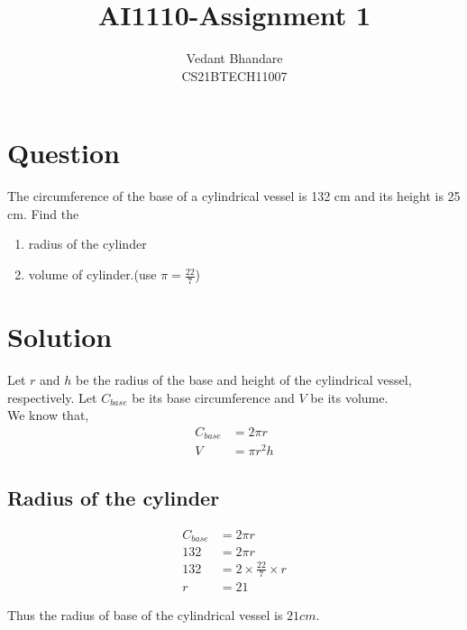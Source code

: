 \documentclass[journal,12pt,twocolumn]{IEEEtran}
\begin{document}
\raggedbottom
\setlength{\parindent}{0pt}
\vspace{3cm}
\title{AI1110-Assignment 1}
\author{Vedant Bhandare\\CS21BTECH11007}
\maketitle
\newpage
\bigskip
\renewcommand{\thefigure}{\theenumi}
\renewcommand{\thetable}{\theenumi}

\section{\textbf{Question}}
The circumference of the base of a cylindrical vessel is 132 cm and its height is 25 cm. Find the

\begin{enumerate}
    \item radius of the cylinder
    \item volume of cylinder.(use $\pi = \frac{22}{7}$)
\end{enumerate}
\section{\textbf{Solution}}
Let $r$ and $h$ be the radius of the base and height of the cylindrical vessel, respectively.
Let $C_{base}$ be its base circumference and $V$ be its volume.\\

We know that,
\begin{align}
    C_{base} &= 2\pi{r}\\
    V &= \pi{r^2h}
\end{align}

\subsection{\textbf{Radius of the cylinder}}
\begin{align}
C_{base} &= 2\pi{r}\\
132 &= 2\pi{r}\\
132 &= 2\times\frac{22}{7}\times{r}\\
r &= 21
\end{align}
\begin{center}
    Thus the radius of base of the cylindrical vessel is $21 cm$.
\end{center}
\end{document}
